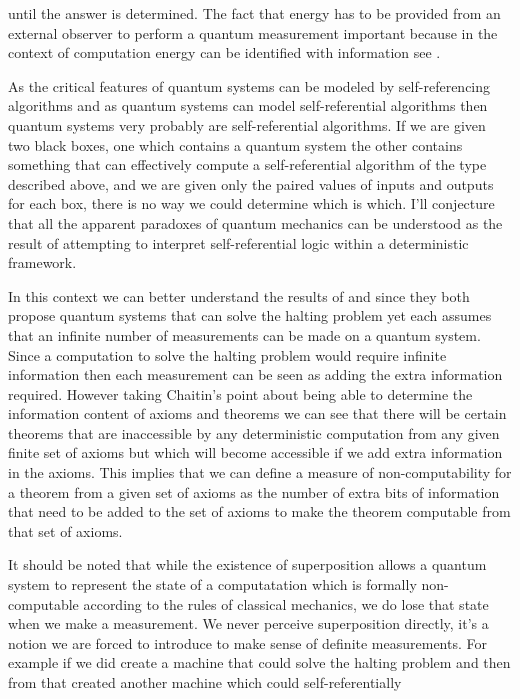 \documentclass[
   ,final            %
  ]
  {aipproc}
\begin{document}
until the answer is determined. The fact that energy has to be provided from an external observer to perform a quantum measurement important because %
in the context of computation energy can be identified with information see \citet{Bennet_1982}.
\par As the critical features of quantum systems can be modeled by
self-referencing algorithms and as quantum systems can model self-referential algorithms then quantum
systems very probably are self-referential algorithms. If we are given two black boxes, one which contains
a quantum system the other contains something that can effectively compute a self-referential algorithm
of the type described above, and we are given only the paired values of inputs and outputs for each box,
there is no way we could determine which is which. I'll conjecture that all the apparent paradoxes of
quantum mechanics can be understood as the result of attempting to interpret self-referential logic within
a deterministic framework. 
\par
In this context we can better understand the results of \citet{Kieu} and \citet{Calude_turing_barrier} since they both propose
quantum systems that can solve the halting problem yet each assumes that an infinite number of measurements
can be made on a quantum system. Since a computation to solve the halting problem would require
infinite information then each measurement can be seen as adding the extra information required. However
taking Chaitin's point about being able to determine the information content of axioms and theorems we
can see that there will be certain theorems that are inaccessible by any deterministic computation from any
given finite set of axioms but which will become accessible if we add extra information in the axioms. This implies that
we can define a measure of non-computability for a theorem from a given set of axioms as the number of extra bits
of information that need to be added to the set of axioms to make the theorem computable from that set of axioms.
\par
It should be noted that while the existence of superposition allows a quantum system to represent the
state of a computatation which is formally non-computable according to the rules of classical mechanics, we
do lose that state when we make a measurement. We never perceive superposition directly, it's a notion we
are forced to introduce to make sense of definite measurements. For example if we did create a machine that
could solve the halting problem and then from that created another machine which could self-referentially
\end{document}
